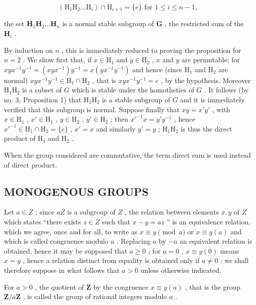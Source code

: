 \[
\left(\mathrm{H} _ {1} \mathrm{H} _ {2} \dots \mathrm{H} _ {i}\right) \cap \mathrm{H} _ {i + 1} = \{e \} \text { for } 1 \leqslant i \leqslant n - 1,
\]

the set \(\mathbf{H}_1\mathbf{H}_2\ldots \mathbf{H}_n\) is a normal stable subgroup of \(\mathbf{G}\) , the restricted sum of the \(\mathbf{H}_i\) .

By induction on \(n\) , this is immediately reduced to proving the proposition for \(n = 2\) . We show first that, if \(x \in \mathrm{H}_1\) and \(y \in \mathrm{H}_2\) , \(x\) and \(y\) are permutable; for \(xyx^{-1}y^{-1} = (xyx^{-1})y^{-1} = x(yx^{-1}y^{-1})\) and hence (since \(\mathrm{H}_1\) and \(\mathrm{H}_2\) are normal) \(xyx^{-1}y^{-1} \in \mathrm{H}_1 \cap \mathrm{H}_2\) , that is \(xyx^{-1}y^{-1} = e\) , by the hypothesis. Moreover \(\mathrm{H}_1\mathrm{H}_2\) is a subset of \(G\) which is stable under the homotheties of \(G\) . It follows (by no. 3, Proposition 1) that \(\mathrm{H}_1\mathrm{H}_2\) is a stable subgroup of \(G\) and it is immediately verified that this subgroup is normal. Suppose finally that \(xy = x'y'\) , with \(x \in \mathrm{H}_1\) , \(x' \in \mathrm{H}_1\) , \(y \in \mathrm{H}_2\) , \(y' \in \mathrm{H}_2\) ; then \(x'^{-1}x = y'y^{-1}\) , hence \(x'^{-1} \in \mathrm{H}_1 \cap \mathrm{H}_2 = \{e\}\) , \(x' = x\) and similarly \(y' = y\) ; \(\mathrm{H}_1\mathrm{H}_2\) is thus the direct product of \(\mathrm{H}_1\) and \(\mathrm{H}_2\) .

When the group considered are commutative, the term direct sum is used instead of direct product.

\subsection{MONOGENOUS GROUPS}

Let \(a \in Z\) ; since \(aZ\) is a subgroup of \(Z\) , the relation between elements \(x, y\) of \(Z\) which states ``there exists \(z \in Z\) such that \(x - y = az\) '' is an equivalence relation, which we agree, once and for all, to write as \(x \equiv y \pmod{a}\) or \(x \equiv y(a)\) and which is called congruence modulo \(a\) . Replacing \(a\) by \(-a\) an equivalent relation is obtained, hence it may be supposed that \(a \geqslant 0\) ; for \(a = 0\) , \(x \equiv y(0)\) means \(x = y\) , hence a relation distinct from equality is obtained only if \(a \neq 0\) : we shall therefore suppose in what follows that \(a > 0\) unless otherwise indicated.

For \(a > 0\) , the quotient of \(\mathbf{Z}\) by the congruence \(x \equiv y(a)\) , that is the group \(\mathbf{Z}/a\mathbf{Z}\) , is called the group of rational integers modulo \(a\) .

